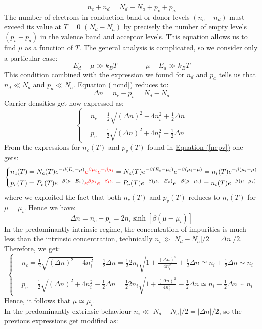 \documentclass[10.75pt,a4paper,openright,bottom=2cm]{article}
\renewcommand{\refeq}[1]{\hyperref[#1]{Equation (\ref{#1})}}
\begin{document}
\begin{equation}
\label{ncnd}
n_c+n_d=N_d-N_a+p_v+p_a
\end{equation}
The number of electrons in conduction band or donor levels $(n_c+n_d)$ must exceed its value at $T=0$ $(N_d-N_a)$ by precisely the number of empty levels $(p_v+p_a)$ in the valence band and acceptor levels. This equation allows us to find $\mu$ as a function of $T$. The general analysis is complicated, so we consider only a particular case:
\[
E_d-\mu\gg k_BT \qquad \qquad \mu-E_a\gg k_BT
\]
This condition combined with the expression we found for $n_d$ and $p_a$ tells us that $n_d\ll N_d$ and $p_a\ll N_a$. \refeq{ncnd} reduces to:
\[
\Delta n=n_c-p_v=N_d-N_a
\]
Carrier densities get now expressed as:
\[
\left\{
\begin{aligned}
&n_c=\frac{1}{2}\sqrt{(\Delta n)^2+4n_i^2}+\frac{1}{2}\Delta n\\
&p_v=\frac{1}{2}\sqrt{(\Delta n)^2+4n_i^2}-\frac{1}{2}\Delta n
\end{aligned}
\right.
\]
From the expressions for $n_c(T)$ and $p_v(T)$ found in \refeq{ncpv} one gets:
\[
\left\{
\begin{aligned}
&n_c(T)=N_c(T)e^{-\beta(E_c-\mu)}{\color{red}{e^{\beta\mu_i}e^{-\beta\mu_i}}}=N_c(T)e^{-\beta(E_c-\mu_i)}e^{-\beta(\mu_i-\mu)}=n_i(T)e^{-\beta(\mu_i-\mu)}\\
&p_v(T)=P_v(T)e^{-\beta(\mu-E_v)}{\color{red}{e^{\beta\mu_i}e^{-\beta\mu_i}}}=P_v(T)e^{-\beta(\mu_i-E_v)}e^{-\beta(\mu-\mu_i)}=n_i(T)e^{-\beta(\mu-\mu_i)}
\end{aligned}
\right.
\]
where we exploited the fact that both $n_c(T)$ and $p_v(T)$ reduces to $n_i(T)$ for $\mu=\mu_i$. Hence we have:
\[
\Delta n=n_c-p_v=2n_i\sinh{[\beta(\mu-\mu_i)]}
\]
In the predominantly intrinsic regime, the concentration of impurities is much less than the intrinsic concentration, technically $n_i\gg|N_d-N_a|/2=|\Delta n|/2$. Therefore, we get:
\[
\left\{
\begin{aligned}
&n_c=\frac{1}{2}\sqrt{(\Delta n)^2+4n_i^2}+\frac{1}{2}\Delta n=\frac{1}{2}2n_i\sqrt{1+\frac{(\Delta n)^2}{4n_i^2}}+\frac{1}{2}\Delta n\simeq n_i+\frac{1}{2}\Delta n\sim n_i\\
&p_v=\frac{1}{2}\sqrt{(\Delta n)^2+4n_i^2}-\frac{1}{2}\Delta n=\frac{1}{2}2n_i\sqrt{1+\frac{(\Delta n)^2}{4n_i^2}}-\frac{1}{2}\Delta n\simeq n_i-\frac{1}{2}\Delta n\sim n_i
\end{aligned}
\right.
\]
Hence, it follows that $\mu\simeq\mu_i$.\\
In the predominantly extrinsic behaviour $n_i\ll|N_d-N_a|/2=|\Delta n|/2$, so the previous expressions get modified as:
\end{document}
